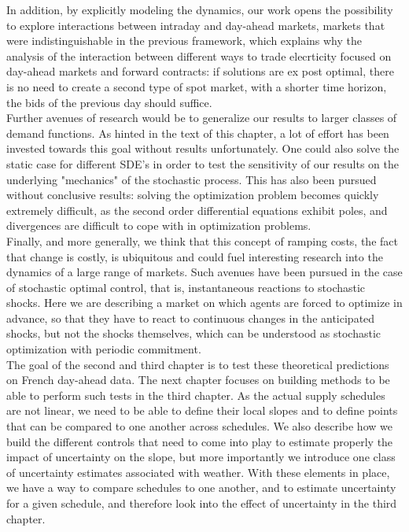 In addition, by explicitly modeling the dynamics, our work opens the possibility to explore interactions between intraday and day-ahead markets, markets that were indistinguishable in the previous framework, which explains why the analysis of the interaction between different ways to trade elecrticity focused on day-ahead markets and forward contracts: if solutions are ex post optimal, there is no need to create a second type of spot market, with a shorter time horizon, the bids of the previous day should suffice. \\

Further avenues of research would be to generalize our results to larger classes of demand functions. As hinted in the text of this chapter, a lot of effort has been invested towards this goal without results unfortunately. One could also solve the static case for different SDE's in order to test the sensitivity of our results on the underlying "mechanics" of the stochastic process. This has also been pursued without conclusive results: solving the optimization problem becomes quickly extremely difficult, as the second order differential equations exhibit poles, and divergences are difficult to cope with in optimization problems.\\

Finally, and more generally, we think that this concept of ramping costs, the fact that change is costly, is ubiquitous and could fuel interesting research into the dynamics of a large range of markets. Such avenues have been pursued in the case of stochastic optimal control, that is, instantaneous reactions to stochastic shocks. Here we are describing a market on which agents are forced to optimize in advance, so that they have to react to continuous changes in the anticipated shocks, but not the shocks themselves, which can be understood as stochastic optimization with periodic commitment. \\

The goal of the second and third chapter is to test these theoretical predictions on French day-ahead data. The next chapter focuses on building methods to be able to perform such tests in the third chapter. As the actual supply schedules are not linear, we need to be able to define their local slopes and to define points that can be compared to one another across schedules. We also describe how we build the different controls that need to come into play to estimate properly the impact of uncertainty on the slope, but more importantly we introduce one class of uncertainty estimates associated with weather. With these elements in place, we have a way to compare schedules to one another, and to estimate uncertainty for a given schedule, and therefore look into the effect of uncertainty in the third chapter. 

